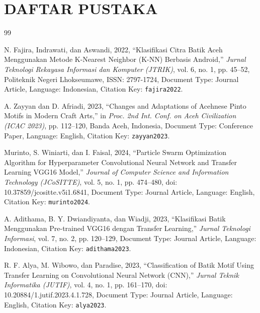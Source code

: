 \documentclass[10pt,a4paper]{article}
\begin{document}
\section*{DAFTAR PUSTAKA}

\begingroup
\renewcommand{\section}[2]{}%
\begin{thebibliography}{99}
\fontsize{8pt}{9.8pt}\selectfont
\setlength{\itemsep}{0.5pt}
\setlength{\parskip}{0pt}

N. Fajira, Indrawati, dan Aswandi, 2022, ``Klasifikasi Citra Batik Aceh Menggunakan Metode K-Nearest Neighbor (K-NN) Berbasis Android,'' \textit{Jurnal Teknologi Rekayasa Informasi dan Komputer (JTRIK)}, vol. 6, no. 1, pp. 45--52, Politeknik Negeri Lhokseumawe, ISSN: 2797-1724, Document Type: Journal Article, Language: Indonesian, Citation Key: \texttt{fajira2022}.

A. Zayyan dan D. Afriadi, 2023, ``Changes and Adaptations of Acehnese Pinto Motifs in Modern Craft Arts,'' in \textit{Proc. 2nd Int. Conf. on Aceh Civilization (ICAC 2023)}, pp. 112--120, Banda Aceh, Indonesia, Document Type: Conference Paper, Language: English, Citation Key: \texttt{zayyan2023}.

Murinto, S. Winiarti, dan I. Faisal, 2024, ``Particle Swarm Optimization Algorithm for Hyperparameter Convolutional Neural Network and Transfer Learning VGG16 Model,'' \textit{Journal of Computer Science and Information Technology (JCoSITTE)}, vol. 5, no. 1, pp. 474--480, doi: 10.37859/jcositte.v5i1.6841, Document Type: Journal Article, Language: English, Citation Key: \texttt{murinto2024}.

A. Adithama, B. Y. Dwiandiyanta, dan Wiadji, 2023, ``Klasifikasi Batik Menggunakan Pre-trained VGG16 dengan Transfer Learning,'' \textit{Jurnal Teknologi Informasi}, vol. 7, no. 2, pp. 120--129, Document Type: Journal Article, Language: Indonesian, Citation Key: \texttt{adithama2023}.

R. F. Alya, M. Wibowo, dan Paradise, 2023, ``Classification of Batik Motif Using Transfer Learning on Convolutional Neural Network (CNN),'' \textit{Jurnal Teknik Informatika (JUTIF)}, vol. 4, no. 1, pp. 161--170, doi: 10.20884/1.jutif.2023.4.1.728, Document Type: Journal Article, Language: English, Citation Key: \texttt{alya2023}.


\end{thebibliography}
\end{document}

